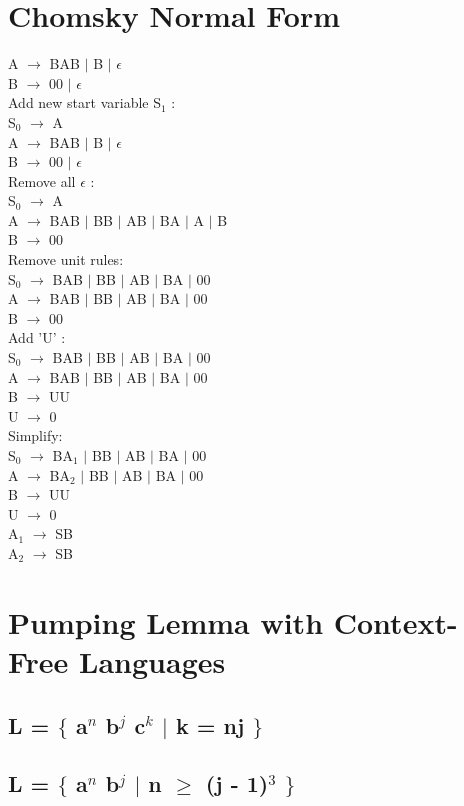 \documentclass[10pt,a4paper]{article}
\begin{document}
\section{Chomsky Normal Form}
	A $\rightarrow$ BAB $\mid$ B $\mid$ $\epsilon$\\
	B $\rightarrow$ 00 $\mid$ $\epsilon$\\
	Add new start variable S$_{1}$ :\\
		S$_{0}$	$\rightarrow$ A\\
		A $\rightarrow$ BAB $\mid$ B $\mid$ $\epsilon$\\
		B $\rightarrow$ 00 $\mid$ $\epsilon$\\		
	Remove all $\epsilon$ :\\
		S$_{0}$	$\rightarrow$ A\\
		A $\rightarrow$ BAB $\mid$ BB $\mid$ AB $\mid$ BA $\mid$ A $\mid$ B \\
		B $\rightarrow$ 00\\
	Remove unit rules:\\
		S$_{0}$	$\rightarrow$ BAB $\mid$ BB $\mid$ AB $\mid$ BA $\mid$ 00\\
		A $\rightarrow$ BAB $\mid$ BB $\mid$ AB $\mid$ BA $\mid$ 00\\
		B $\rightarrow$ 00\\
	Add 'U' :\\
		S$_{0}$	$\rightarrow$ BAB $\mid$ BB $\mid$ AB $\mid$ BA $\mid$ 00\\
		A $\rightarrow$ BAB $\mid$ BB $\mid$ AB $\mid$ BA $\mid$ 00\\
		B $\rightarrow$ UU\\
		U $\rightarrow$ 0\\
	Simplify: \\
		S$_{0}$	$\rightarrow$ BA$_{1}$ $\mid$ BB $\mid$ AB $\mid$ BA $\mid$ 00\\
		A $\rightarrow$ BA$_{2}$ $\mid$ BB $\mid$ AB $\mid$ BA $\mid$ 00\\
		B $\rightarrow$ UU\\
		U $\rightarrow$ 0\\
		A$_{1}$ $\rightarrow$ SB\\
		A$_{2}$ $\rightarrow$ SB\\
		
\section{Pumping Lemma with Context-Free Languages}
\subsection{L = $\lbrace$ a$^{n}$ b$^{j}$ c$^{k}$ $\mid$ k = nj $\rbrace$}



\subsection{L = $\lbrace$ a$^{n}$ b$^{j}$ $\mid$ n $\geq$ (j - 1)$^{3}$ $\rbrace$}
\end{document}
